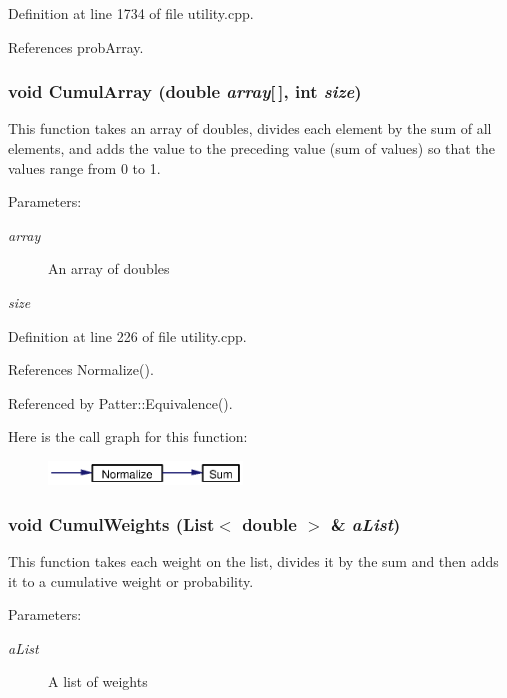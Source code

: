 Definition at line 1734 of file utility.cpp.

References prob\-Array.
\subsubsection{\setlength{\rightskip}{0pt plus 5cm}void Cumul\-Array (double {\em array}[$\,$], int {\em size})}\label{utility_8cpp_a7}


This function takes an array of doubles, divides each element by the sum of all elements, and adds the value to the preceding value (sum of values) so that the values range from 0 to 1. \begin{Desc}
\item[Parameters:]
\begin{description}
\item[{\em array}]An array of doubles \item[{\em size}]\end{description}
\end{Desc}


Definition at line 226 of file utility.cpp.

References Normalize().

Referenced by Patter::Equivalence().

Here is the call graph for this function:\begin{figure}[H]
\begin{center}
\leavevmode
\includegraphics[width=146pt]{utility_8cpp_a7_cgraph}
\end{center}
\end{figure}
\subsubsection{\setlength{\rightskip}{0pt plus 5cm}void Cumul\-Weights ({\bf List}$<$ double $>$ \& {\em a\-List})}\label{utility_8cpp_a8}


This function takes each weight on the list, divides it by the sum and then adds it to a cumulative weight or probability. \begin{Desc}
\item[Parameters:]
\begin{description}
\item[{\em a\-List}]A list of weights \end{description}
\end{Desc}


